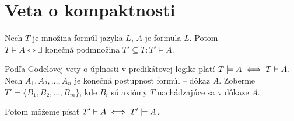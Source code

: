 \section{Veta o kompaktnosti}

\begin{veta}[O kompaktnosti]
    Nech $T$ je množina formúl jazyka $L$, $A$ je formula $L$. Potom
    $T \models A \iff \exists 
        \mbox{ konečná podmnožina }T'\subseteq T: T' \models A$.
\end{veta}

\begin{dokaz}
    Podľa G\"odelovej vety o úplnosti v predikátovej logike platí
    $T \models A \iff T \vdash A$.
    Nech $A_1, A_2, \dots , A_n$ je konečná postupnosť formúl --
    dôkaz $A$. Zoberme $T' = \{B_1, B_2, \dots, B_m\}$, kde $B_i$ sú axiómy
    $T$ nachádzajúce sa v dôkaze $A$.

    Potom môžeme písať $T' \vdash A \iff T' \models A$.
    \\
\end{dokaz}

